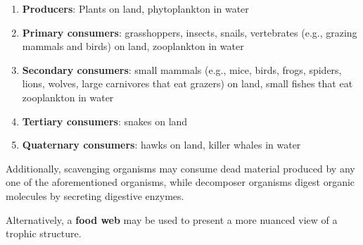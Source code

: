 \documentclass{article}
\begin{document}
\begin{enumerate}
	\item \textbf{Producers}: Plants on land, phytoplankton in water
	\item \textbf{Primary consumers}: grasshoppers, insects, snails,
	vertebrates (e.g., grazing mammals and birds) on land, zooplankton in water
	\item \textbf{Secondary consumers}: small mammals (e.g., mice, birds, frogs,
	spiders, lions, wolves, large carnivores that eat grazers) on land, small
	fishes that eat zooplankton in water
	\item \textbf{Tertiary consumers}: snakes on land
	\item \textbf{Quaternary consumers}: hawks on land, killer whales in water
\end{enumerate}

Additionally, scavenging organisms may consume dead material produced by any one
of the aforementioned organisms, while decomposer organisms digest organic
molecules by secreting digestive enzymes.

Alternatively, a \textbf{food web} may be used to present a more nuanced view of
a trophic structure.
\end{document}
